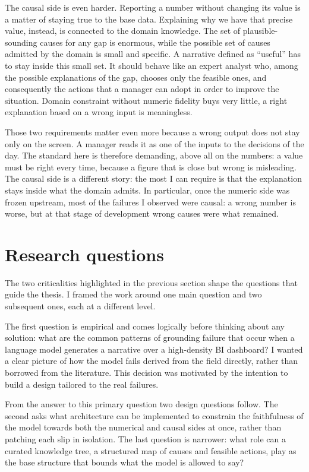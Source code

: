 \documentclass[12pt,a4paper,openright,twoside]{book}
\begin{document}
The causal side is even harder. Reporting a number without changing its value is a matter of staying true to the base data. 
Explaining why we have that precise value, instead, is connected to the domain knowledge. 
The set of plausible-sounding causes for any gap is enormous, while the possible set of causes admitted by the domain is small and specific. 
A narrative defined as \enquote{useful} has to stay inside this small set. 
It should behave like an expert analyst who, among the possible explanations of the gap, chooses only the feasible ones, and consequently the actions that a manager can adopt in order to improve the situation.
Domain constraint without numeric fidelity buys very little, a right explanation based on a wrong input is meaningless.

Those two requirements matter even more because a wrong output does not stay only on the screen. 
A manager reads it as one of the inputs to the decisions of the day.
The standard here is therefore demanding, above all on the numbers: a value must be right every time, because a figure that is close but wrong is misleading.
The causal side is a different story: the most I can require is that the explanation stays inside what the domain admits.
In particular, once the numeric side was frozen upstream, most of the failures I observed were causal: a wrong number is worse, but at that stage of development wrong causes were what remained.


\section{Research questions}
\label{sec:Research_questions:}
The two criticalities highlighted in the previous section shape the questions that guide the thesis.
I framed the work around one main question and two subsequent ones, each at a different level.

The first question is empirical and comes logically before thinking about any solution: what are the common patterns of grounding failure that occur when a language model generates a narrative over a high-density \ac{BI} dashboard?
I wanted a clear picture of how the model fails derived from the field directly, rather than borrowed from the literature. 
This decision was motivated by the intention to build a design tailored to the real failures.

From the answer to this primary question two design questions follow. 
The second asks what architecture can be implemented to constrain the faithfulness of the model towards both the numerical and causal sides at once, rather than patching each slip in isolation.
The last question is narrower: what role can a curated knowledge tree, a structured map of causes and feasible actions, play as the base structure that bounds what the model is allowed to say?
\end{document}
